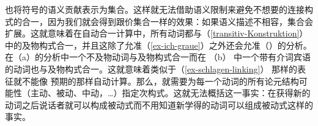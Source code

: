  \citet{KF99a} 也将符号的语义贡献表示为集合。这样就无法借助语义限制来避免不想要的连接构式的合一，因为我们就会得到跟价集合一样的效果：如果语义描述不相容，集合会扩展。这就意味着在自动合一计算中，所有动词都与（\ref{transitiv-Konstruktion}）中的及物构式合一，并且这除了允准（\ref{ex-ich-graue}）之外还会允准（）的分析。
\eal
{}
\zl
在（a）的分析中一个不及物动词与及物构式合一而在 （b） 中一个带有介词宾语的动词也与及物构式合一。这就意味着类似于（\ref{ex-schlagen-linking}） 那样的表征就不能像 \citet{Kay2002a}预期的那样自动计算。那么，就需要为每一个动词的所有论元结构可能性（主动、被动、中动，\ldots）指定次构式。这就无法概括这一事实：在获得新的动词之后说话者就可以构成被动式而不用知道新学得的动词可以组成被动式这样的事实。%
%

